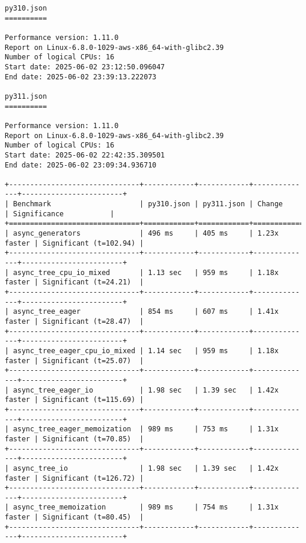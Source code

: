 \begin{code}
    \begin{verbatim}
py310.json
==========

Performance version: 1.11.0
Report on Linux-6.8.0-1029-aws-x86_64-with-glibc2.39
Number of logical CPUs: 16
Start date: 2025-06-02 23:12:50.096047
End date: 2025-06-02 23:39:13.222073

py311.json
==========

Performance version: 1.11.0
Report on Linux-6.8.0-1029-aws-x86_64-with-glibc2.39
Number of logical CPUs: 16
Start date: 2025-06-02 22:42:35.309501
End date: 2025-06-02 23:09:34.936710

+-------------------------------+------------+------------+--------------+------------------------+
| Benchmark                     | py310.json | py311.json | Change       | Significance           |
+===============================+============+============+==============+========================+
| async_generators              | 496 ms     | 405 ms     | 1.23x faster | Significant (t=102.94) |
+-------------------------------+------------+------------+--------------+------------------------+
| async_tree_cpu_io_mixed       | 1.13 sec   | 959 ms     | 1.18x faster | Significant (t=24.21)  |
+-------------------------------+------------+------------+--------------+------------------------+
| async_tree_eager              | 854 ms     | 607 ms     | 1.41x faster | Significant (t=28.47)  |
+-------------------------------+------------+------------+--------------+------------------------+
| async_tree_eager_cpu_io_mixed | 1.14 sec   | 959 ms     | 1.18x faster | Significant (t=25.07)  |
+-------------------------------+------------+------------+--------------+------------------------+
| async_tree_eager_io           | 1.98 sec   | 1.39 sec   | 1.42x faster | Significant (t=115.69) |
+-------------------------------+------------+------------+--------------+------------------------+
| async_tree_eager_memoization  | 989 ms     | 753 ms     | 1.31x faster | Significant (t=70.85)  |
+-------------------------------+------------+------------+--------------+------------------------+
| async_tree_io                 | 1.98 sec   | 1.39 sec   | 1.42x faster | Significant (t=126.72) |
+-------------------------------+------------+------------+--------------+------------------------+
| async_tree_memoization        | 989 ms     | 754 ms     | 1.31x faster | Significant (t=80.45)  |
+-------------------------------+------------+------------+--------------+------------------------+

\end{verbatim}
\end{code}
